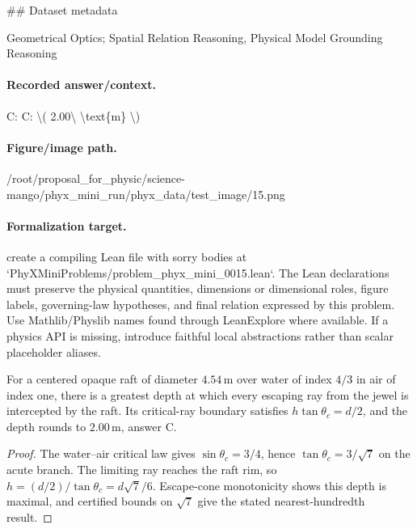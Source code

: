 \#\# Dataset metadata

Geometrical Optics; Spatial Relation Reasoning, Physical Model Grounding Reasoning

\paragraph{Recorded answer/context.}
C: C: \textbackslash{}( 2.00\textbackslash{} \textbackslash{}text\{m\} \textbackslash{})

\paragraph{Figure/image path.}
/root/proposal\_for\_physic/science-mango/phyx\_mini\_run/phyx\_data/test\_image/15.png

\paragraph{Formalization target.}
create a compiling Lean file with sorry bodies at `PhyXMiniProblems/problem\_phyx\_mini\_0015.lean`. The Lean declarations must preserve the physical quantities, dimensions or dimensional roles, figure labels, governing-law hypotheses, and final relation expressed by this problem.
Use Mathlib/Physlib names found through LeanExplore where available. If a physics API is missing, introduce faithful local abstractions rather than scalar placeholder aliases.

\begin{theorem}
\label{thm:physics:phyx_mini_0015:target}
For a centered opaque raft of diameter \(4.54\,\mathrm m\) over water of
index \(4/3\) in air of index one, there is a greatest depth at which every
escaping ray from the jewel is intercepted by the raft.  Its critical-ray
boundary satisfies \(h\tan\theta_c=d/2\), and the depth rounds to
\(2.00\,\mathrm m\), answer C.
\end{theorem}
\begin{proof}
The water--air critical law gives
\(\sin\theta_c=3/4\), hence \(\tan\theta_c=3/\sqrt7\) on the acute branch.
The limiting ray reaches the raft rim, so
\(h=(d/2)/\tan\theta_c=d\sqrt7/6\).  Escape-cone monotonicity shows this
depth is maximal, and certified bounds on \(\sqrt7\) give the stated
nearest-hundredth result.
\end{proof}

